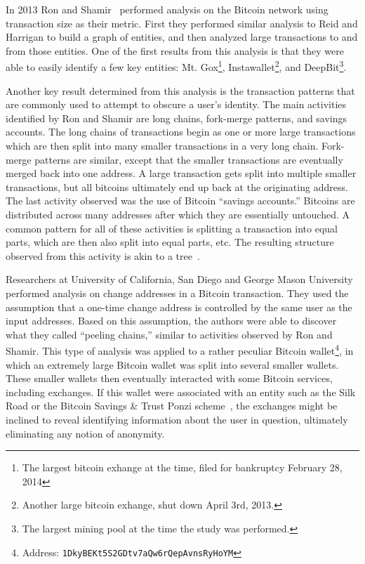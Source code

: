 \documentclass[11pt]{article}
\begin{document}
In 2013 Ron and Shamir~\cite{ron13} performed analysis on the Bitcoin network using transaction size as their metric.
First they performed similar analysis to Reid and Harrigan to build a graph of entities, and then analyzed large
transactions to and from those entities. One of the first results from this analysis is that they were able to easily
identify a few key entities: Mt.  Gox\footnote{The largest bitcoin exhange at the time, filed for bankruptcy February
28, 2014}, Instawallet\footnote{Another large bitcoin exhange, shut down April 3rd, 2013.}, and DeepBit\footnote{The
largest mining pool at the time the study was performed.}.

Another key result determined from this analysis is the transaction patterns that are commonly used to attempt to
obscure a user's identity. The main activities identified by Ron and Shamir are long chains, fork-merge patterns, and
savings accounts. The long chains of transactions begin as one or more large transactions which are then split into many
smaller transactions in a very long chain. Fork-merge patterns are similar, except that the smaller transactions are
eventually merged back into one address. A large transaction gets split into multiple smaller transactions, but all
bitcoins ultimately end up back at the originating address. The last activity observed was the use of Bitcoin ``savings
accounts.'' Bitcoins are distributed across many addresses after which they are essentially untouched. A common pattern
for all of these activities is splitting a transaction into equal parts, which are then also split into equal parts,
etc. The resulting structure observed from this activity is akin to a tree~\cite{ron13}.

Researchers at University of California, San Diego and George Mason University~\cite{meiklejohn13} performed analysis on
change addresses in a Bitcoin transaction. They used the assumption that a one-time change address is controlled by the
same user as the input addresses. Based on this assumption, the authors were able to discover what they called ``peeling
chains,'' similar to activities observed by Ron and Shamir. This type of analysis was applied to a rather peculiar
Bitcoin wallet\footnote{Address: {\tt 1DkyBEKt5S2GDtv7aQw6rQepAvnsRyHoYM}}, in which an extremely large Bitcoin wallet
was split into several smaller wallets. These smaller wallets then eventually interacted with some Bitcoin services,
including exchanges. If this wallet were associated with an entity such as the Silk Road or the Bitcoin Savings \& Trust
Ponzi scheme~\cite{moore13}, the exchanges might be inclined to reveal identifying information about the user in
question, ultimately eliminating any notion of anonymity.
\end{document}
